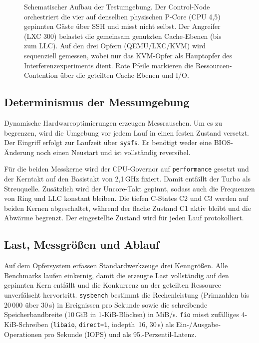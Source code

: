\documentclass[conference]{IEEEtran}
\begin{document}
\begin{figure}[t]
\caption{Schematischer Aufbau der Testumgebung. Der Control-Node orchestriert die vier auf denselben physischen P-Core (CPU 4,5) gepinnten Gäste über SSH und misst nicht selbst. Der Angreifer (LXC 300) belastet die gemeinsam genutzten Cache-Ebenen (bis zum LLC). Auf den drei Opfern (QEMU/LXC/KVM) wird sequenziell gemessen, wobei nur das KVM-Opfer als Hauptopfer des Interferenzexperiments dient. Rote Pfeile markieren die Ressourcen-Contention über die geteilten Cache-Ebenen und I/O.}
\label{fig:setup}
\end{figure}

\subsection{Determinismus der Messumgebung}
Dynamische Hardwareoptimierungen erzeugen Messrauschen. Um es zu begrenzen, wird die Umgebung vor jedem Lauf in einen festen Zustand versetzt. Der Eingriff erfolgt zur Laufzeit über \texttt{sysfs}. Er benötigt weder eine BIOS-Änderung noch einen Neustart und ist vollständig reversibel.

Für die beiden Messkerne wird der CPU-Governor auf \texttt{performance} gesetzt und der Kerntakt auf den Basistakt von 2{,}1\,GHz fixiert. Damit entfällt der Turbo als Streuquelle. Zusätzlich wird der Uncore-Takt gepinnt, sodass auch die Frequenzen von Ring und LLC konstant bleiben. Die tiefen C-States C2 und C3 werden auf beiden Kernen abgeschaltet, während der flache Zustand C1 aktiv bleibt und die Abwärme begrenzt. Der eingestellte Zustand wird für jeden Lauf protokolliert.

\subsection{Last, Messgrößen und Ablauf}
Auf dem Opfersystem erfassen Standardwerkzeuge drei Kenngrößen. Alle Benchmarks laufen einkernig, damit die erzeugte Last vollständig auf den gepinnten Kern entfällt und die Konkurrenz an der geteilten Ressource unverfälscht hervortritt. \texttt{sysbench} bestimmt die Rechenleistung (Primzahlen bis 20\,000 über 30\,s) in Ereignissen pro Sekunde sowie die schreibende Speicherbandbreite (10\,GiB in 1-KiB-Blöcken) in MiB/s. \texttt{fio} misst zufälliges 4-KiB-Schreiben (\texttt{libaio}, \texttt{direct=1}, iodepth~16, 30\,s) als Ein-/Ausgabe-Operationen pro Sekunde (IOPS) und als 95.-Perzentil-Latenz.
\end{document}
